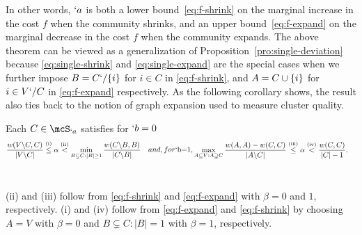 In other words, $`a$ is both a lower bound~\eqref{eq:f-shrink} on the marginal increase in the cost
$f$ when the community shrinks, and an upper bound~\eqref{eq:f-expand} on the marginal decrease in
the cost $f$ when the community expands. The above theorem can be viewed as a generalization of
Proposition~\ref{pro:single-deviation} because \eqref{eq:single-shrink} and \eqref{eq:single-expand}
are the special cases when we further impose $B=C`/\{i\}$ for $i\in C$ in \eqref{eq:f-shrink}, and
$A=C\cup \{i\}$ for $i\in V`/C$ in \eqref{eq:f-expand} respectively. As the following corollary
shows, the result also ties back to the notion of graph expansion used to measure cluster quality.

\begin{corollary}
  Each $C\in \mcS_{`a}$ satisfies for $`b=0$
  \begin{subequations}
    \begin{align}
      \label{eq:bound-beta0}
      \frac{w(V\backslash C, C)}{|V\backslash C|} 
      &
        \stackrel{ \rm{(i)} }{\leq}
        \alpha
        \stackrel{ \rm{(ii)} }{<}
        \min_{B\subsetneq C: |B| \geq 1} \frac{w(C\backslash B, B)}{|C\backslash B|} 
    \end{align}
    and, for $`b=1$,
    \begin{align}
      \label{eq:bound-beta1}
      \max_{A\subseteq V: A\supsetneq C} \frac{w(A,A)-w(C,C)}{|A\backslash C|}  
      &
        \stackrel{ \rm{(iii)} }{\leq}
        \alpha
        \stackrel{ \rm{(iv)} }{<}
        \frac{w(C, C)}{|C|-1}. 
    \end{align}
  \end{subequations}
  ~\relax
\end{corollary}
\begin{Proof}
  (ii) and (iii) follow from \eqref{eq:f-shrink} and \eqref{eq:f-expand} with $\beta=0$ and $1$,
  respectively. (i) and (iv) follow from \eqref{eq:f-expand} and \eqref{eq:f-shrink} by choosing
 	$A= V$ 
	with $\beta = 0$
	and
	$B\subsetneq C:|B|=1$
	with $\beta = 1$, respectively.
\end{Proof}

